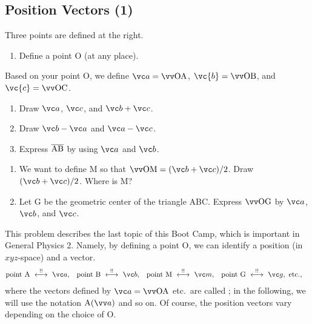\documentclass[11pt,pdfa,lastpage]{MishoNote}
\begin{document}
\subsection{Position Vectors (1)}
\begin{problems}
  \Problem[S] Three points are defined at the right.\par
  \noindent\begin{minipage}[b]{0.55\textwidth}
    \begin{enumerate}
      \item Define a point O (at any place).
    \end{enumerate}
    Based on your point O, we define $\vc a=\vvv{OA}$, $\vc{b}=\vvv{OB}$, and $\vc{c}=\vvv{OC}$.
    \begin{enumerate}[resume]
      \item Draw $\vc a$, $\vc c$, and $\vc b+\vc c$.
      \item Draw $\vc b-\vc a$ and $\vc a-\vc c$.
      \item Express $\overline{\mathrm{AB}}$ by using $\vc a$ and $\vc b$.
    \end{enumerate}
  \end{minipage}
    \begin{minipage}[b]{0.35\textwidth}
    \vspace{-1.5em}\par
    \hfill\usebox{\VectorSetB}
    \par\vspace{1em}
  \end{minipage}
\begin{enumerate}[start=5]
  \item We want to define M so that $\vvv{OM}=(\vc b+\vc c)/2$. Draw $(\vc b+\vc c)/2$. Where is M?
  \item Let G be the geometric center of the triangle ABC. Express $\vvv{OG}$ by $\vc a$, $\vc b$, and $\vc c$.
\end{enumerate}
\end{problems}
\noindent
This problem describes the last topic of this Boot Camp, which is important in General Physics 2.
Namely, by defining a point O, we can identify a position (in $xyz$-space) and a vector.
\begin{align*}
&\text{point A}\idrel \vc a,&
&\text{point B}\idrel \vc b,&
&\text{point M}\idrel \vc m,&
&\text{point G}\idrel \vc g, \text{~etc.,}
\end{align*}
where the vectors defined by $\vc a=\vvv{OA}$ etc.\ are called ; in the following, we will use the notation $\posvec Aa$ and so on.
Of course, the position vectors vary depending on the choice of O.
\end{document}
